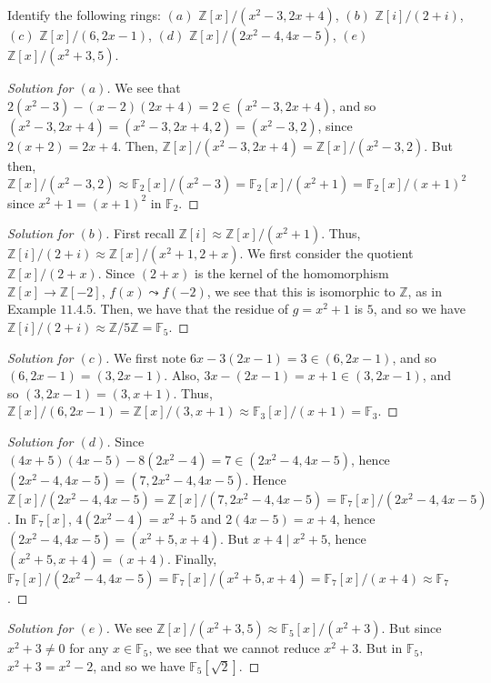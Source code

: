 \documentclass[12pt]{article}
\theoremstyle{remark}
\begin{document}
\begin{problem}
  Identify the following rings: $(a)$ $\mathbb{Z}[x]/(x^2-3,2x+4)$, $(b)$ $\mathbb{Z}[i]/(2+i)$, $(c)$ $\mathbb{Z}[x]/(6,2x-1)$, $(d)$ $\mathbb{Z}[x]/(2x^2-4,4x-5)$, $(e)$ $\mathbb{Z}[x]/(x^2+3,5)$.
\end{problem}
\begin{proof}[Solution for $(a)$]
  We see that $2(x^2-3)-(x-2)(2x+4) = 2 \in (x^2-3,2x+4)$, and so $(x^2-3,2x+4) = (x^2-3,2x+4,2) = (x^2-3,2)$, since $2(x+2) = 2x+4$. Then, $\mathbb{Z}[x]/(x^2-3,2x+4) = \mathbb{Z}[x]/(x^2-3,2)$. But then, $\mathbb{Z}[x]/(x^2-3,2) \approx \mathbb{F}_2[x]/(x^2-3) = \mathbb{F}_2[x]/(x^2+1) = \mathbb{F}_2[x]/(x+1)^2$ since $x^2 + 1 = (x+1)^2$ in $\mathbb{F}_2$.
\end{proof}
\begin{proof}[Solution for $(b)$]
  First recall $\mathbb{Z}[i] \approx \mathbb{Z}[x]/(x^2+1)$. Thus, $\mathbb{Z}[i]/(2+i) \approx \mathbb{Z}[x]/(x^2+1,2+x)$. We first consider the quotient $\mathbb{Z}[x]/(2+x)$. Since $(2+x)$ is the kernel of the homomorphism $\mathbb{Z}[x] \to \mathbb{Z}[-2]$, $f(x) \leadsto f(-2)$, we see that this is isomorphic to $\mathbb{Z}$, as in Example $11.4.5$. Then, we have that the residue of $g = x^2+1$ is $5$, and so we have $\mathbb{Z}[i]/(2+i) \approx \mathbb{Z}/5\mathbb{Z} = \mathbb{F}_5$.
\end{proof}
\begin{proof}[Solution for $(c)$]
  We first note $6x - 3(2x-1) = 3 \in (6,2x-1)$, and so $(6,2x-1) = (3,2x-1)$. Also, $3x - (2x-1) = x+1 \in (3,2x-1)$, and so $(3,2x-1) = (3,x+1)$. Thus, $\mathbb{Z}[x]/(6,2x-1) = \mathbb{Z}[x]/(3,x+1) \approx \mathbb{F}_3[x]/(x+1) = \mathbb{F}_3$.
\end{proof}
\begin{proof}[Solution for $(d)$]
  Since $(4x+5)(4x-5) - 8(2x^2-4) = 7 \in (2x^2-4,4x-5)$, hence $(2x^2-4,4x-5) = (7,2x^2-4,4x-5)$. Hence $\mathbb{Z}[x]/(2x^2-4,4x-5) = \mathbb{Z}[x]/(7,2x^2-4,4x-5) = \mathbb{F}_7[x]/(2x^2-4,4x-5)$. In $\mathbb{F}_7[x]$, $4(2x^2-4) = x^2+5$ and $2(4x-5) = x + 4$, hence $(2x^2-4,4x-5) = (x^2+5,x+4)$. But $x+4 \mid x^2 + 5$, hence $(x^2+5,x+4) = (x+4)$. Finally, $\mathbb{F}_7[x]/(2x^2-4,4x-5) = \mathbb{F}_7[x]/(x^2+5,x+4) = \mathbb{F}_7[x]/(x+4) \approx \mathbb{F}_7$.
\end{proof}
\begin{proof}[Solution for $(e)$]
  We see $\mathbb{Z}[x]/(x^2+3,5) \approx \mathbb{F}_5[x]/(x^2+3)$. But since $x^2+3 \ne 0$ for any $x \in \mathbb{F}_5$, we see that we cannot reduce $x^2+3$. But in $\mathbb{F}_5$, $x^2+3 = x^2-2$, and so we have $\mathbb{F}_5[\sqrt{2}]$.
\end{proof}
\end{document}

